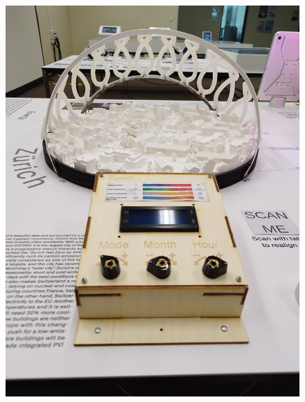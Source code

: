 \documentclass[a4paper,9pt]{article}
\begin{document}
\begin{landscape}
    

\begin{minipage}{0.48\linewidth}
         \begin{figure}[H]
        \centering
        \includegraphics[width=\linewidth]{Images/n1.jpg}
        \label{fin1}
    \end{figure}
    \end{minipage}
    \hfill
    \begin{minipage}{0.48\linewidth}
         \begin{figure}[H]
        \centering

\end{figure}
\end{minipage}
\end{landscape}
\end{document}
